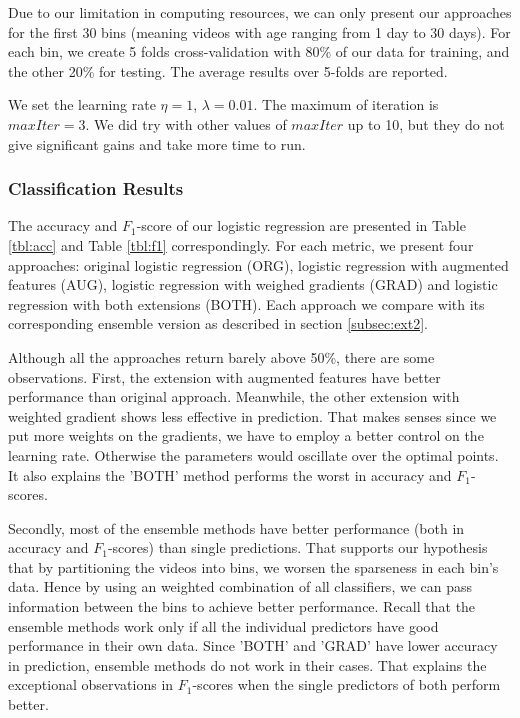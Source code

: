 Due to our limitation in computing resources, we can only present our approaches for the first 30 bins (meaning videos with age ranging from 1 day to 30 days). For each bin, we create 5 folds cross-validation with 80\% of our data for training, and the other 20\% for testing. The average results over 5-folds are reported.

We set the learning rate $\eta=1$, $\lambda=0.01$. The maximum of iteration is $maxIter=3$. We did try with other values of $maxIter$ up to 10, but they do not give significant gains and take more time to run.

\subsubsection{Classification Results}
	The accuracy and $F_1$-score of our logistic regression are presented in Table \ref{tbl:acc} and Table \ref{tbl:f1} correspondingly. For each metric, we present four approaches: original logistic regression (ORG), logistic regression with augmented features (AUG), logistic regression with weighed gradients (GRAD) and logistic regression with both extensions (BOTH). Each approach we compare with its corresponding ensemble version as described in section \ref{subsec:ext2}. 
	
Although all the approaches return barely above 50\%, there are some observations. First, the extension with augmented features have better performance than original approach. Meanwhile, the other extension with weighted gradient shows less effective in prediction.  That makes senses since we put more weights on the gradients, we have to employ a better control on the learning rate. Otherwise the parameters would oscillate over the optimal points. It also explains the 'BOTH' method performs the worst in accuracy and $F_1$-scores.
	
Secondly, most of the ensemble methods have better performance (both in accuracy and $F_1$-scores) than single predictions. That supports our hypothesis that by partitioning the videos into bins, we worsen the sparseness in each bin's data. Hence by using an weighted combination of all classifiers, we can pass information between the bins to achieve better performance. Recall that the ensemble methods work only if all the individual predictors have good performance in their own data. Since 'BOTH' and 'GRAD' have lower accuracy in prediction, ensemble methods do not work in their cases. That explains the exceptional observations in $F_1$-scores when the single predictors of both perform better.
		
